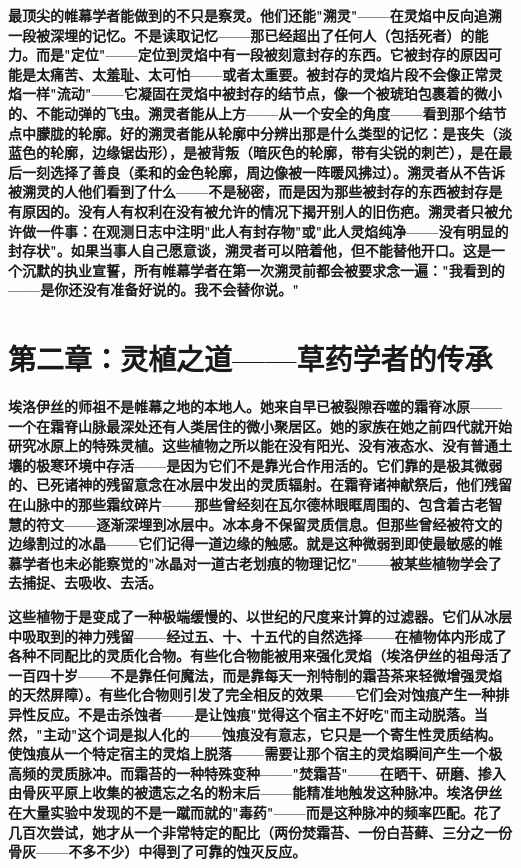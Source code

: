 \documentclass[12pt,a4paper,openany]{ctexbook}
\begin{document}
\textbf{最顶尖的帷幕学者能做到的不只是察灵。他们还能"溯灵"——在灵焰中反向追溯一段被深埋的记忆。不是读取记忆——那已经超出了任何人（包括死者）的能力。而是"定位"——定位到灵焰中有一段被刻意封存的东西。它被封存的原因可能是太痛苦、太羞耻、太可怕——或者太重要。被封存的灵焰片段不会像正常灵焰一样"流动"——它凝固在灵焰中被封存的结节点，像一个被琥珀包裹着的微小的、不能动弹的飞虫。溯灵者能从上方——从一个安全的角度——看到那个结节点中朦胧的轮廓。好的溯灵者能从轮廓中分辨出那是什么类型的记忆：是丧失（淡蓝色的轮廓，边缘锯齿形），是被背叛（暗灰色的轮廓，带有尖锐的刺芒），是在最后一刻选择了善良（柔和的金色轮廓，周边像被一阵暖风拂过）。溯灵者从不告诉被溯灵的人他们看到了什么——不是秘密，而是因为那些被封存的东西被封存是有原因的。没有人有权利在没有被允许的情况下揭开别人的旧伤疤。溯灵者只被允许做一件事：在观测日志中注明"此人有封存物"或"此人灵焰纯净——没有明显的封存状"。如果当事人自己愿意谈，溯灵者可以陪着他，但不能替他开口。这是一个沉默的执业宣誓，所有帷幕学者在第一次溯灵前都会被要求念一遍："我看到的——是你还没有准备好说的。我不会替你说。"}


\section*{第二章：灵植之道——草药学者的传承}


\textbf{埃洛伊丝的师祖不是帷幕之地的本地人。她来自早已被裂隙吞噬的霜脊冰原——一个在霜脊山脉最深处还有人类居住的微小聚居区。她的家族在她之前四代就开始研究冰原上的特殊灵植。这些植物之所以能在没有阳光、没有液态水、没有普通土壤的极寒环境中存活——是因为它们不是靠光合作用活的。它们靠的是极其微弱的、已死诸神的残留意念在冰层中发出的灵质辐射。在霜脊诸神献祭后，他们残留在山脉中的那些霜纹碎片——那些曾经刻在瓦尔德林眼眶周围的、包含着古老智慧的符文——逐渐深埋到冰层中。冰本身不保留灵质信息。但那些曾经被符文的边缘割过的冰晶——它们记得一道边缘的触感。就是这种微弱到即使最敏感的帷慕学者也未必能察觉的"冰晶对一道古老划痕的物理记忆"——被某些植物学会了去捕捉、去吸收、去活。}


\textbf{这些植物于是变成了一种极端缓慢的、以世纪的尺度来计算的过滤器。它们从冰层中吸取到的神力残留——经过五、十、十五代的自然选择——在植物体内形成了各种不同配比的灵质化合物。有些化合物能被用来强化灵焰（埃洛伊丝的祖母活了一百四十岁——不是靠任何魔法，而是靠每天一剂特制的霜苔茶来轻微增强灵焰的天然屏障）。有些化合物则引发了完全相反的效果——它们会对蚀痕产生一种排异性反应。不是击杀蚀者——是让蚀痕"觉得这个宿主不好吃"而主动脱落。当然，"主动"这个词是拟人化的——蚀痕没有意志，它只是一个寄生性灵质结构。使蚀痕从一个特定宿主的灵焰上脱落——需要让那个宿主的灵焰瞬间产生一个极高频的灵质脉冲。而霜苔的一种特殊变种——"焚霜苔"——在晒干、研磨、掺入由骨灰平原上收集的被遗忘之名的粉末后——能精准地触发这种脉冲。埃洛伊丝在大量实验中发现的不是一蹴而就的"毒药"——而是这种脉冲的频率匹配。花了几百次尝试，她才从一个非常特定的配比（两份焚霜苔、一份白苔藓、三分之一份骨灰——不多不少）中得到了可靠的蚀灭反应。}
\end{document}
